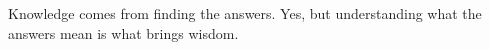 \documentclass[onecolumn]{book}
\begin{document}
% 

% 

Knowledge comes from finding the answers. Yes, but understanding what the answers mean is what brings wisdom.


% 


\end{document}
